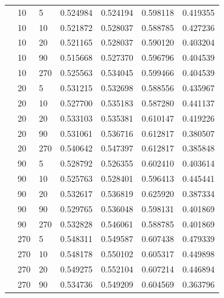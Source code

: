 \documentclass[pageno]{jpaper}
\begin{document}
\begin{longtable}{p{2cm} p{2cm} p{2cm} p{2cm} p{2cm} p{2cm} p{2cm}}
& 10 & 5 & 0.524984 & 0.524194 & 0.598118 & 0.419355 \\

& 10 & 10 & 0.521872 & 0.528037 & 0.588785 & 0.427236 \\

& 10 & 20 & 0.521165 & 0.528037 & 0.590120 & 0.403204 \\

& 10 & 90 & 0.515668 & 0.527370 & 0.596796 & 0.404539 \\

& 10 & 270 & 0.525563 & 0.534045 & 0.599466 & 0.404539 \\

& 20 & 5 & 0.531215 & 0.532698 & 0.588556 & 0.435967 \\

& 20 & 10 & 0.527700 & 0.535183 & 0.587280 & 0.441137 \\

& 20 & 20 & 0.533103 & 0.535381 & 0.610147 & 0.419226 \\

& 20 & 90 & 0.531061 & 0.536716 & 0.612817 & 0.380507 \\

& 20 & 270 & 0.540642 & 0.547397 & 0.612817 & 0.385848 \\

& 90 & 5 & 0.528792 & 0.526355 & 0.602410 & 0.403614 \\

& 90 & 10 & 0.525763 & 0.528401 & 0.596413 & 0.445441 \\

& 90 & 20 & 0.532617 & 0.536819 & 0.625920 & 0.387334 \\

& 90 & 90 & 0.529765 & 0.536048 & 0.598131 & 0.401869 \\

& 90 & 270 & 0.532828 & 0.546061 & 0.588785 & 0.401869 \\

& 270 & 5 & 0.548311 & 0.549587 & 0.607438 & 0.479339 \\

& 270 & 10 & 0.548178 & 0.550102 & 0.605317 & 0.449898 \\

& 270 & 20 & 0.549275 & 0.552104 & 0.607214 & 0.446894 \\

& 270 & 90 & 0.534736 & 0.549209 & 0.604569 & 0.363796 \\


\end{longtable}
\end{document}
